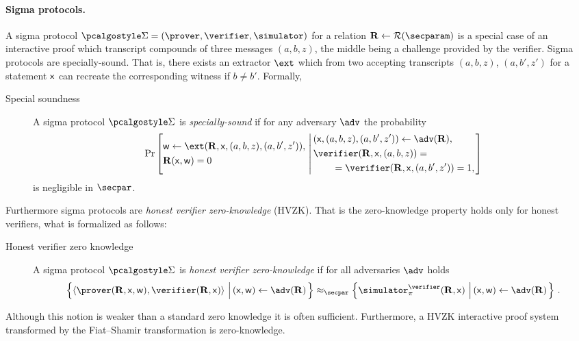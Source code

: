 \documentclass[runningheads,11pt]{llncs}
\theoremstyle{definition}
\begin{document}
\paragraph{Sigma protocols.}
A sigma protocol $\sigmaprot = (\prover, \verifier, \simulator)$  for a relation
$\REL \gets \RELGEN(\secparam)$  is a special case of an interactive proof which transcript compounds of three messages $(a, b, z)$, the middle being a challenge provided by the verifier.
Sigma protocols are specially-sound. That is, there exists an extractor $\ext$ which from two accepting transcripts $(a, b, z)$, $(a, b', z')$ for a statement $\mathsf{x}$ can recreate the corresponding witness if $b \neq b'$. Formally,
\begin{description}
	\item[Special soundness] A sigma protocol $\sigmaprot$ is \emph{specially-sound} if for any adversary $\adv$ the probability
	\[
		\Pr\left[
		\begin{aligned}
				& \wit \gets \ext(\REL, \inp, (a, b, z), (a, b', z')),\\
				& \REL(\inp, \wit) = 0
		\end{aligned}
		\,\left|\,
		\begin{aligned}
			& (\inp, (a, b, z), (a, b', z')) \gets \adv(\REL), \\
			& \verifier(\REL, \inp, (a, b, z)) = \\
			& \qquad = \verifier(\REL, \inp, (a, b', z')) = 1, \\
		\end{aligned}
		\right.\right]
	\]
	is negligible in $\secpar$.
\end{description}

Furthermore sigma protocols are \emph{honest verifier zero-knowledge} (HVZK). That is the zero-knowledge property holds only for honest verifiers, what is formalized as follows:
\begin{description}
	\item[Honest verifier zero knowledge] A sigma protocol $\sigmaprot$ is \emph{honest verifier zero-knowledge} if for all adversaries $\adv$ holds
	\begin{multline*}
		\left\{\ip{\prover(\REL, \inp, \wit)}{\verifier(\REL, \inp)} \,\left|\, (\inp, \wit) \gets \adv(\REL)\vphantom{\simulator_\zkproof^\adv}\right.\right\} \approx_\secpar
		\left\{\simulator_\zkproof^{\verifier}(\REL, \inp)\,\left|\, (\inp, \wit) \gets \adv(\REL)\vphantom{\simulator^\adv}\right.\right\}\,.
	\end{multline*}
\end{description}
Although this notion is weaker than a standard zero knowledge it is often sufficient. Furthermore, a HVZK interactive proof system transformed by the Fiat--Shamir transformation is zero-knowledge.
\end{document}
